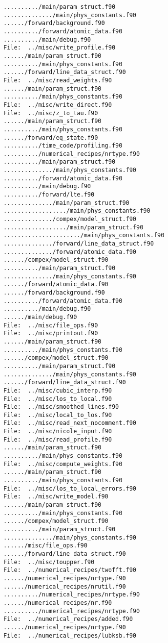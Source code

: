 \begin{verbatim}
........../main/param_struct.f90
............../main/phys_constants.f90
....../forward/background.f90
........../forward/atomic_data.f90
........../main/debug.f90
File:  ../misc/write_profile.f90
....../main/param_struct.f90
........../main/phys_constants.f90
....../forward/line_data_struct.f90
File:  ../misc/read_weights.f90
....../main/param_struct.f90
........../main/phys_constants.f90
File:  ../misc/write_direct.f90
File:  ../misc/z_to_tau.f90
....../main/param_struct.f90
........../main/phys_constants.f90
....../forward/eq_state.f90
........../time_code/profiling.f90
........../numerical_recipes/nrtype.f90
........../main/param_struct.f90
............../main/phys_constants.f90
........../forward/atomic_data.f90
........../main/debug.f90
........../forward/lte.f90
............../main/param_struct.f90
................../main/phys_constants.f90
............../compex/model_struct.f90
................../main/param_struct.f90
....................../main/phys_constants.f90
............../forward/line_data_struct.f90
............../forward/atomic_data.f90
....../compex/model_struct.f90
........../main/param_struct.f90
............../main/phys_constants.f90
....../forward/atomic_data.f90
....../forward/background.f90
........../forward/atomic_data.f90
........../main/debug.f90
....../main/debug.f90
File:  ../misc/file_ops.f90
File:  ../misc/printout.f90
....../main/param_struct.f90
........../main/phys_constants.f90
....../compex/model_struct.f90
........../main/param_struct.f90
............../main/phys_constants.f90
....../forward/line_data_struct.f90
File:  ../misc/cubic_interp.f90
File:  ../misc/los_to_local.f90
File:  ../misc/smoothed_lines.f90
File:  ../misc/local_to_los.f90
File:  ../misc/read_next_nocomment.f90
File:  ../misc/nicole_input.f90
File:  ../misc/read_profile.f90
....../main/param_struct.f90
........../main/phys_constants.f90
File:  ../misc/compute_weights.f90
....../main/param_struct.f90
........../main/phys_constants.f90
File:  ../misc/los_to_local_errors.f90
File:  ../misc/write_model.f90
....../main/param_struct.f90
........../main/phys_constants.f90
....../compex/model_struct.f90
........../main/param_struct.f90
............../main/phys_constants.f90
....../misc/file_ops.f90
....../forward/line_data_struct.f90
File:  ../misc/toupper.f90
File:  ../numerical_recipes/twofft.f90
....../numerical_recipes/nrtype.f90
....../numerical_recipes/nrutil.f90
........../numerical_recipes/nrtype.f90
....../numerical_recipes/nr.f90
........../numerical_recipes/nrtype.f90
File:  ../numerical_recipes/added.f90
....../numerical_recipes/nrtype.f90
File:  ../numerical_recipes/lubksb.f90

\end{verbatim}
